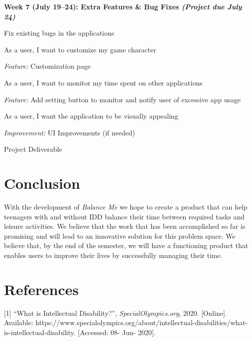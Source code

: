 \documentclass{sigchi}
\begin{document}
\begin{myitemize}
	\item \textbf{Week 7 (July 19--24): Extra Features \& Bug Fixes \textit{(Project due July 24)}}
	\begin{myitemize}
		\item Fix existing bugs in the applications
		\item As a user, I want to customize my game character
		\begin{myitemize}
			\item \textit{Feature:} Customization page
		\end{myitemize}
		\item As a user, I want to monitor my time spent on other applications
		\begin{myitemize}
			\item \textit{Feature:} Add setting button to monitor and notify user of excessive app usage
		\end{myitemize}
		\item As a user, I want the application to be visually appealing
		\begin{myitemize}
			\item \textit{Improvement:} UI Improvements (if needed)
		\end{myitemize}
		\item Project Deliverable
	\end{myitemize}

\end{myitemize}

\section{Conclusion}

With the development of \textit{Balance Me} we hope to create a product that
can help teenagers with and without IDD balance their time between required
tasks and leisure activities. We believe that the work that has been
accomplished so far is promising and will lead to an innovative solution for
this problem space. We believe that, by the end of the semester, we will have a
functioning product that enables users to improve their lives by successfully
managing their time.

\section{References}
[1] ``What is Intellectual Disability?'', \textit{SpecialOlympics.org}, 2020. [Online]. Available: https://www.specialolympics.org/about/intellectual-disabilities/what-is-intellectual-disability. [Accessed: 08- Jun- 2020].
\end{document}
